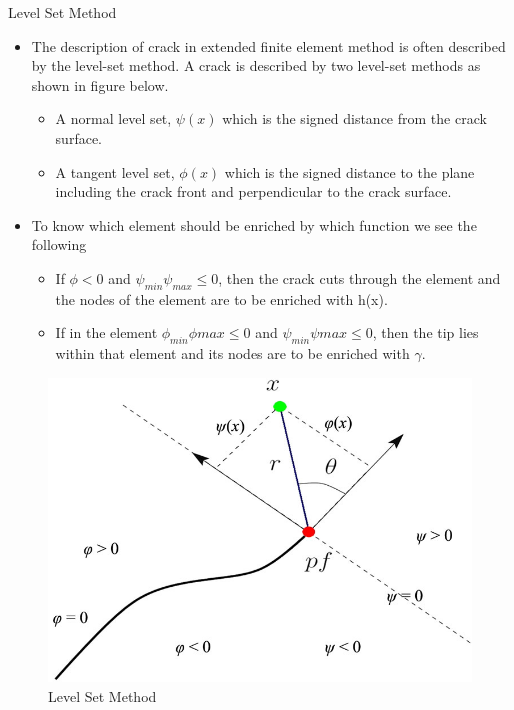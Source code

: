 \documentclass{beamer}
\begin{document}
\begin{frame}[t,fragile]{Level Set Method}
    \begin{itemize}
        \item  The description of crack in extended finite element method is often described by the level-set method. A crack is described by two level-set methods as shown in figure below.
                     \begin{itemize}
        \item A normal level set, $\psi(x)$ which is the signed distance from the crack surface.
        \item A tangent level set, $\phi(x)$ which is the signed distance to the plane including the crack front and perpendicular to the crack surface.
        \end{itemize}
    \item To know which element should be enriched by which function we see the following
        \begin{itemize}
            \item If $\phi < 0 $ and $\psi_{min}\psi_{max}\leq 0$, then the crack cuts through the element and the nodes of the element are to be enriched with h(x).
            \item If in the element $\phi_{min}\phi{max}\leq 0$ and $\psi_{min}\psi{max}\leq 0 $, then the tip lies within that element and its nodes are to be enriched with $\gamma$.
        \end{itemize}

    \end{itemize}
\end{frame}
\begin{frame}
      \begin{figure}
                \centering
                \includegraphics[scale=.2]{levelset.jpg}
                \caption{Level Set Method}
                \label{4}
            \end{figure}
\end{frame}
\end{document}

